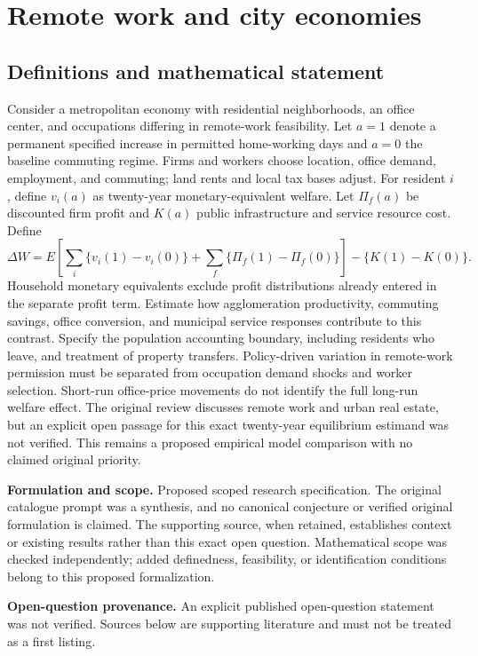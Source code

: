 \documentclass[11pt]{article}
\begin{document}
\section*{Remote work and city economies}\label{30007750}
\subsection{Definitions and mathematical statement}
Consider a metropolitan economy with residential neighborhoods, an office center, and occupations differing in remote-work feasibility. Let \(a=1\) denote a permanent specified increase in permitted home-working days and \(a=0\) the baseline commuting regime. Firms and workers choose location, office demand, employment, and commuting; land rents and local tax bases adjust. For resident \(i\), define \(v_i(a)\) as twenty-year monetary-equivalent welfare. Let \(\Pi_f(a)\) be discounted firm profit and \(K(a)\) public infrastructure and service resource cost. Define
\[\Delta W=E\!\left[\sum_i\{v_i(1)-v_i(0)\}+\sum_f\{\Pi_f(1)-\Pi_f(0)\}\right]-\{K(1)-K(0)\}.\]
Household monetary equivalents exclude profit distributions already entered in the separate profit term. Estimate how agglomeration productivity, commuting savings, office conversion, and municipal service responses contribute to this contrast. Specify the population accounting boundary, including residents who leave, and treatment of property transfers. Policy-driven variation in remote-work permission must be separated from occupation demand shocks and worker selection. Short-run office-price movements do not identify the full long-run welfare effect. The original review discusses remote work and urban real estate, but an explicit open passage for this exact twenty-year equilibrium estimand was not verified. This remains a proposed empirical model comparison with no claimed original priority.

\par\textbf{Formulation and scope.} Proposed scoped research specification. The original catalogue prompt was a synthesis, and no canonical conjecture or verified original formulation is claimed. The supporting source, when retained, establishes context or existing results rather than this exact open question. Mathematical scope was checked independently; added definedness, feasibility, or identification conditions belong to this proposed formalization.

\par\textbf{Open-question provenance.} An explicit published open-question statement was not verified. Sources below are supporting literature and must not be treated as a first listing.
\end{document}
